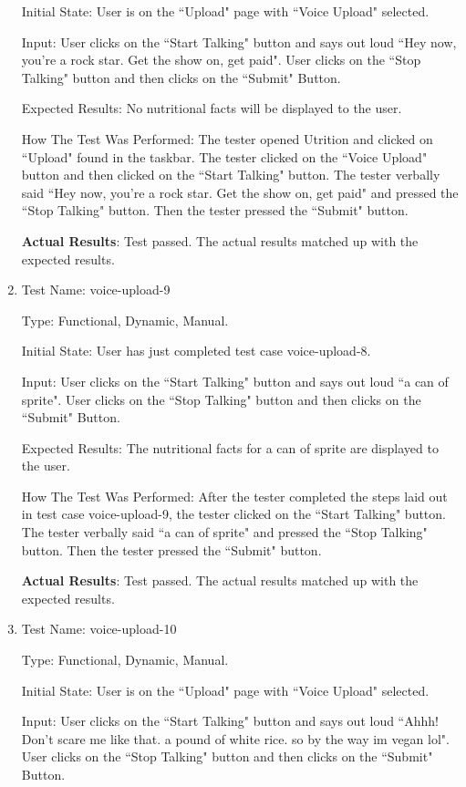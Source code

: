 \documentclass[12pt, titlepage]{article}
\begin{document}
\begin{enumerate}
		Initial State: User is on the ``Upload" page with ``Voice Upload" selected.
		
		Input: User clicks on the ``Start Talking" button and says out loud ``Hey now, you're a rock star. Get the show on, get paid". User clicks on the ``Stop Talking" button and then clicks on the ``Submit" Button.
		
		Expected Results: No nutritional facts will be displayed to the user.
		
		How The Test Was Performed: The tester opened Utrition and clicked on ``Upload" found in the taskbar. The tester clicked on the ``Voice Upload" button and then clicked on the ``Start Talking" button. The tester verbally said ``Hey now, you're a rock star. Get the show on, get paid" and pressed the ``Stop Talking" button. Then the tester pressed the ``Submit" button.
		
		\textbf{Actual Results}: Test passed. The actual results matched up with the expected results.
		
		\item{Test Name: voice-upload-9}
		
		Type: Functional, Dynamic, Manual.
		
		Initial State: User has just completed test case voice-upload-8.
		
		Input: User clicks on the ``Start Talking" button and says out loud ``a can of sprite". User clicks on the ``Stop Talking" button and then clicks on the ``Submit" Button.
		
		Expected Results: The nutritional facts for a can of sprite are displayed to the user.
		
		How The Test Was Performed: After the tester completed the steps laid out in test case voice-upload-9, the tester clicked on the ``Start Talking" button. The tester verbally said ``a can of sprite" and pressed the ``Stop Talking" button. Then the tester pressed the ``Submit" button.
		
		\textbf{Actual Results}: Test passed. The actual results matched up with the expected results.
		
		\item{Test Name: voice-upload-10}
		
		Type: Functional, Dynamic, Manual.
		
		Initial State: User is on the ``Upload" page with ``Voice Upload" selected.
		
		Input: User clicks on the ``Start Talking" button and says out loud ``Ahhh! Don't scare me like that. a pound of white rice. so by the way im vegan lol". User clicks on the ``Stop Talking" button and then clicks on the ``Submit" Button.
		

\end{enumerate}
\end{document}
